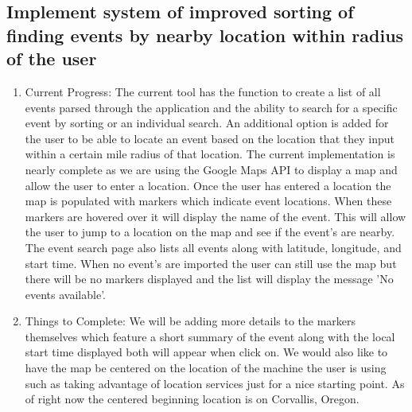 \documentclass[draftclsnofoot,10pt,onecolumn]{IEEEtran} %
\begin{document}
\subsection{Implement system of improved sorting of finding events by nearby location within radius of the user}
\begin{enumerate}[label*=\arabic*.]
  \item Current Progress: The current tool has the function to
    create a list of all events parsed through the application and the ability to
    search for a specific event by sorting or an individual search. An additional
    option is added for the user to be able to locate an event based on the
    location that they input within a certain mile radius of that location. The
    current implementation is nearly complete as we are using the Google Maps API
    to display a map and allow the user to enter a location. Once the user has
    entered a location the map is populated with markers which indicate event
    locations. When these markers are hovered over it will display the name of the
    event. This will allow the user to jump to a location on the map and see if
    the event's are nearby. The event search page also lists all events along with
    latitude, longitude, and start time. When no event's are imported the user can
    still use the map but there will be no markers displayed and the list will
    display the message 'No events available'.


  \item Things to Complete: We will be adding more details to the markers
    themselves which feature a short summary of the event along with the local
    start time displayed both will appear when click on. We would also like to
    have the map be centered on the location of the machine the user is using
    such as taking advantage of location services just for a nice starting
    point. As of right now the centered beginning location is on Corvallis,
    Oregon.


\end{enumerate}
\end{document}
